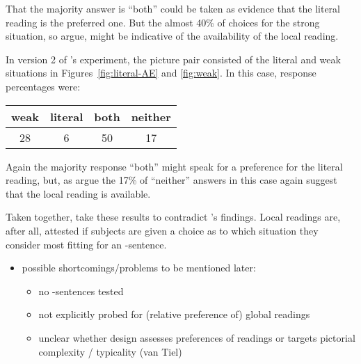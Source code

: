 \documentclass[fleqn,reqno,10pt,draft]{article}
\newcommand{\as}{\acro{as}}
\renewcommand{\es}{\acro{es}}
\begin{document}
\noindent That the majority answer is ``both'' could be taken as
evidence that the literal reading is the preferred one. But the almost
40\% of choices for the strong situation, so
\citeauthor{CliftonDube2010:Embedded-Implic} argue, might be
indicative of the availability of the local reading.

In version 2 of \citeauthor{CliftonDube2010:Embedded-Implic}'s
experiment, the picture pair consisted of the literal and weak
situations in Figures~\ref{fig:literal-AE} and \ref{fig:weak}. In this
case, response percentages were:

\begin{center}
  \begin{tabular}{cccc}
    weak & literal & both & neither
    \\ \midrule 
    28 & 6 & 50 & 17 
  \end{tabular}
\end{center}

\noindent Again the majority response ``both'' might speak for a
preference for the literal reading, but, as
\citeauthor{CliftonDube2010:Embedded-Implic} argue the 17\% of
``neither'' answers in this case again suggest that the local reading
is available.

Taken together, \citeauthor{CliftonDube2010:Embedded-Implic} take
these results to contradict
\citeauthor{GeurtsPouscoulous2009:Embedded-Implic}'s findings. Local
readings are, after all, attested if subjects are given a choice as to
which situation they consider most fitting for an \as-sentence.

\begin{itemize}
\item possible shortcomings/problems to be mentioned later:
  \begin{itemize}
  \item no \es-sentences tested
  \item not explicitly probed for (relative preference of) global
    readings
  \item unclear whether design assesses preferences of readings or
    targets pictorial complexity / typicality (van Tiel)
  \end{itemize}
\end{itemize}


\subsection{\citet{ChemlaSpector2010:Experimental-Ev}}
\label{sec:Chemla-Spector}
\end{document}
